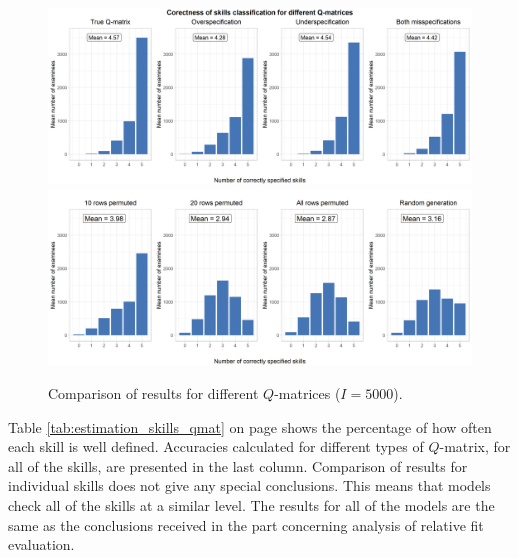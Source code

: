 \documentclass[english]{pwr_wmat_praca_dyplomowa}
\theoremstyle{plain}
\numberwithin{theorem}{chapter}
\theoremstyle{definition}
\numberwithin{theorem}{chapter}
\begin{document}
	\begin{figure}[ht]
		\centering
		\includegraphics[width=\textwidth]{Qmat_skills_classification_5000_col.png}
		\includegraphics[width=\textwidth]{Qmat_skills_classification2_5000_col.png}
		\caption{Comparison of results for different $Q$-matrices ($I=5000$).}
		\label{comparison_qmatrices}
	\end{figure}
	
	\newpage
	Table \ref{tab:estimation_skills_qmat} on page \pageref{tab:estimation_skills_qmat} shows the percentage of how often each skill is well defined.  Accuracies calculated for different types of $Q$-matrix, for all of the skills, are presented in the last column. Comparison of results for individual skills does not give any special conclusions. This means that models check all of the skills at a similar level. The results for all of the models are the same as the conclusions received in the part concerning analysis of relative fit evaluation. 
	
\end{document}
